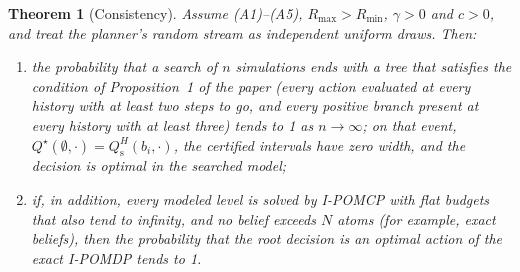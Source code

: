 \documentclass{article}
\newtheorem{theorem}{Theorem}
\begin{document}
\begin{theorem}[Consistency]
\label{thm:consistent}
Assume (A1)--(A5), $R_{\max} > R_{\min}$, $\gamma > 0$ and $c > 0$, and treat the planner's random stream as independent uniform draws. Then:
\begin{enumerate}
\item[(i)] the probability that a search of $n$ simulations ends with a tree that satisfies the condition of Proposition~1 of the paper (every action evaluated at every history with at least two steps to go, and every positive branch present at every history with at least three) tends to 1 as $n \to \infty$; on that event, $Q^\star(\emptyset, \cdot) = Q^H_{\mathrm{s}}(b_i, \cdot)$, the certified intervals have zero width, and the decision is optimal in the searched model;
\item[(ii)] if, in addition, every modeled level is solved by I-POMCP with flat budgets that also tend to infinity, and no belief exceeds $N$ atoms (for example, exact beliefs), then the probability that the root decision is an optimal action of the exact I-POMDP tends to 1.
\end{enumerate}
\end{theorem}
\end{document}
